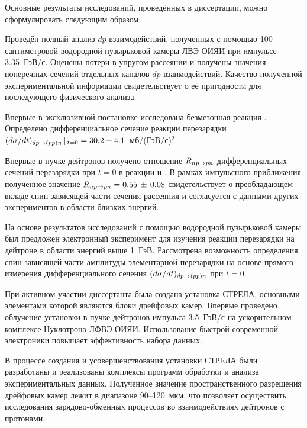 \conclusion
Основные результаты исследований, проведённых в диссертации, можно
сформулировать следующим образом:
\begin{list}{}{\leftmargin=1em}
\item Проведён полный анализ $dp$-взаимодействий, полученных с помощью
  100-сантиметровой водородной пузырьковой камеры ЛВЭ ОИЯИ при импульсе
  3.35~ГэВ/с. Оценены потери в упругом рассеянии и получены значения поперечных
  сечений отдельных каналов $dp$-взаимодей\-ствий. Качество полученной
  экспериментальной информации свидетельствует о её пригодности для последующего
  физического анализа.

  \vspace{1ex}
  Впервые в эксклюзивной постановке исследована безмезонная реакция \dpfrag.
  Определено дифференциальное сечение реакции перезарядки
  $(d\sigma/dt)_{dp \rightarrow (pp)n}\,|\,_{t=0} = 30.2 \pm 4.1$~мб/(ГэВ/с)$^{2}$.

  \vspace{1ex}
  Впервые в пучке дейтронов получено отношение $R_{np \rightarrow pn}$ дифференциальных
  сечений перезарядки при $t=0$ в реакции \dpchex и \np. В рамках импульсного
  приближения полученное значение $R_{np \rightarrow pn} = 0.55\,\pm\,0.08$ свидетельствует о
  преобладающем вкладе спин-зависящей части сечения \np рассеяния и согласуется
  с данными других экспериментов в области близких энергий.

\item На основе результатов исследований с помощью водородной пузырьковой камеры
  был предложен электронный эксперимент для изучения реакции перезарядки на
  дейтроне в области энергий выше 1~ГэВ. Рассмотрена возможность определения
  спин-зависящей части амплитуды элементарной перезарядки \np на основе прямого
  измерения дифференциального сечения $(d\sigma/dt)_{dp \rightarrow (pp)n}$ при $t=0$.

  \vspace{1ex}
  При активном участии диссертанта была создана установка СТРЕЛА, основными
  элементами которой являются блоки дрейфовых камер. Впервые проведено
  облучение установки в пучке дейтронов импульса 3.5~ГэВ/с на ускорительном
  комплексе Нуклотрона ЛФВЭ ОИЯИ. Использование быстрой современной электроники
  повышает эффективность набора данных.

  \vspace{1ex}
  В процессе создания и усовершенствования установки СТРЕЛА были разработаны и
  реализованы комплексы программ обработки и анализа экспериментальных
  данных. Полученное значение пространственного разрешения дрейфовых
  камер лежит в диапазоне 90--120~мкм, что позволяет осуществить исследования
  зарядово-обменных процессов во взаимодействиях дейтронов с протонами.
\end{list}

